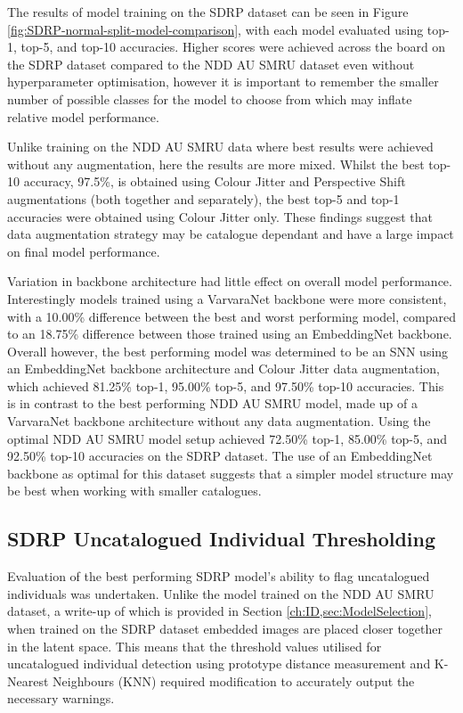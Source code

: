 The results of model training on the SDRP dataset can be seen in Figure \ref{fig:SDRP-normal-split-model-comparison}, with each model evaluated using top-1, top-5, and top-10 accuracies.
Higher scores were achieved across the board on the SDRP dataset compared to the NDD AU SMRU dataset even without hyperparameter optimisation, however it is important to remember the smaller number of possible classes for the model to choose from which may inflate relative model performance.

Unlike training on the NDD AU SMRU data where best results were achieved without any augmentation, here the results are more mixed. Whilst the best top-10 accuracy, 97.5\%, is obtained using Colour Jitter and Perspective Shift augmentations (both together and separately), the best top-5 and top-1 accuracies were obtained using Colour Jitter only. These findings suggest that data augmentation strategy may be catalogue dependant and have a large impact on final model performance. 

Variation in backbone architecture had little effect on overall model performance. Interestingly models trained using a VarvaraNet backbone were more consistent, with a 10.00\% difference between the best and worst performing model, compared to an 18.75\% difference between those trained using an EmbeddingNet backbone. Overall however, the best performing model was determined to be an SNN using an EmbeddingNet backbone architecture and Colour Jitter data augmentation, which achieved 81.25\% top-1, 95.00\% top-5, and 97.50\% top-10 accuracies. This is in contrast to the best performing NDD AU SMRU model, made up of a VarvaraNet backbone architecture without any data augmentation. Using the optimal NDD AU SMRU model setup achieved 72.50\% top-1, 85.00\% top-5, and 92.50\% top-10 accuracies on the SDRP dataset. The use of an EmbeddingNet backbone as optimal for this dataset suggests that a simpler model structure may be best when working with smaller catalogues.

\subsection{SDRP Uncatalogued Individual Thresholding}\label{ch:SNNGeneralisation,sec:SNNEvalWithSDRP,sec:uncatalogued}

Evaluation of the best performing SDRP model's ability to flag uncatalogued individuals was undertaken. Unlike the model trained on the NDD AU SMRU dataset, a write-up of which is provided in Section \ref{ch:ID,sec:ModelSelection}, when trained on the SDRP dataset embedded images are placed closer together in the latent space. This means that the threshold values utilised for uncatalogued individual detection using prototype distance measurement and K-Nearest Neighbours (KNN) required modification to accurately output the necessary warnings. 

